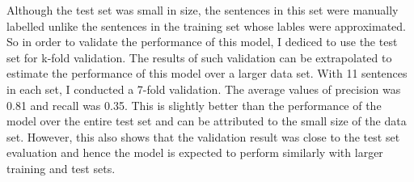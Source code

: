 Although the test set was small in size, the sentences in this set were manually labelled unlike the sentences in the training set whose lables were approximated.
So in order to validate the performance of this model, I dediced to use the test set for k-fold validation.
The results of such validation can be extrapolated to estimate the performance of this model over a larger data set.
With 11 sentences in each set, I conducted a 7-fold validation.
The average values of precision was 0.81 and recall was 0.35.
This is slightly better than the performance of the  model over the entire test set and can be attributed to the small size of the data set.
However, this also shows that the validation result was close to the test set evaluation and hence the model is expected to perform similarly with larger training and test sets.